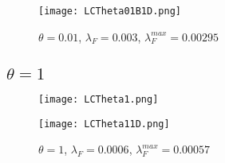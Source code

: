 \documentclass{article}
\newcommand{\lfw}{\lambda_{F}}
\newcommand{\lfw}{\lambda_{F}}
\theoremstyle{definition}
\theoremstyle{remark}
\begin{document}
\begin{figure}[!ht]
\centering
\texttt{[image: LCTheta01B1D.png]}
\caption{$\theta = 0.01$, $\lfw = 0.003$, $\lfw^{max} = 0.00295$}
\end{figure}


\newpage
\subsection{$\theta = 1$}

\begin{figure}[!ht]
\centering
\texttt{[image: LCTheta1.png]}
\end{figure}

\begin{figure}[!ht]
\centering
\texttt{[image: LCTheta11D.png]}
\caption{$\theta = 1$, $\lfw = 0.0006$, $\lfw^{max} = 0.00057$}
\end{figure}
\end{document}
